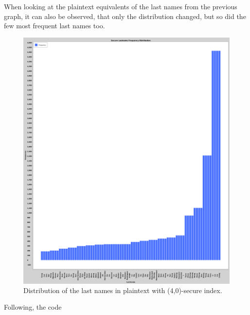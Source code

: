 When looking at the plaintext equivalents of the last names from the previous graph, it can also be observed, that only the distribution changed, but so did the few most frequent last names too.

\begin{figure}[H]
    \centering
    \includegraphics[width=\textwidth]{03-ex2/Secure_Lastname_Frequency_Distribution_Plain.png}
    \caption{Distribution of the last names in plaintext with (4,0)-secure index.}
    \label{fig:Distribution-of-last-names-plain-sec}
\end{figure}


Following, the code 

